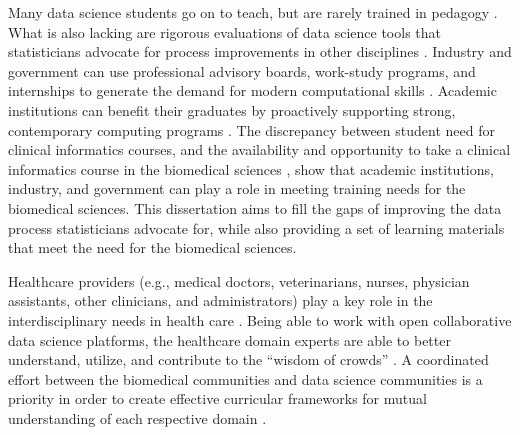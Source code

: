 \documentclass[010-intro.tex]{subfiles}
\begin{document}
Many data science students go on to teach,
but are rarely trained in pedagogy \cite{clevelandDataScienceAction2001}.
What is also lacking are rigorous evaluations of data science tools
that statisticians advocate for process improvements in other disciplines
\cite{clevelandDataScienceAction2001}.
Industry and government can use
professional advisory boards, work-study programs, and internships
to generate the demand for modern computational skills
\cite{cc2020}.
Academic institutions can benefit their graduates by proactively
supporting strong, contemporary computing programs \cite{cc2020}.
The discrepancy between student need for clinical informatics courses,
and the availability and opportunity to take a clinical informatics course in the biomedical sciences
\cite{banerjeeMedicalStudentAwareness2015, americanmedicalassociationStudentInterestInformatics},
show that academic institutions, industry, and government
can play a role in meeting training needs for the biomedical sciences.
This dissertation aims to fill the gaps of improving the data process statisticians advocate for,
while also providing a set of learning materials that meet the need for the biomedical sciences.


Healthcare providers
(e.g., medical doctors, veterinarians, nurses, physician assistants, other clinicians, and administrators)
play a key role in the interdisciplinary needs in health care
\cite{surowiecki2005wisdom, hoytOverviewTwoOpen2018, payneBiomedicalInformaticsMeets2018}.
Being able to work with open collaborative data science platforms,
the healthcare domain experts are able to better understand, utilize, and contribute to the
``wisdom of crowds''
\cite{surowiecki2005wisdom, hoytOverviewTwoOpen2018, payneBiomedicalInformaticsMeets2018}.
A coordinated effort between the biomedical communities and data science communities
is a priority in order to create effective curricular frameworks for mutual understanding
of each respective domain
\cite{payneBiomedicalInformaticsMeets2018}.
\end{document}
